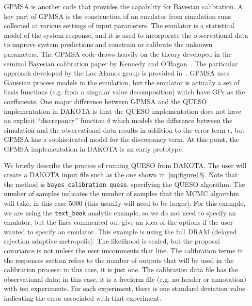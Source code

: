 GPMSA is another code that provides the capability for Bayesian 
calibration.
A key part of GPMSA is the construction of an emulator from simulation runs 
collected at various settings of input parameters.  The emulator is a 
statistical model of the system response, and it is used to incorporate 
the observational data to improve system predictions and constrain or 
calibrate the unknown parameters. The GPMSA code draws heavily 
on the theory developed in the seminal Bayesian calibration paper 
by Kennedy and O'Hagan~\cite{Kenn01}. The particular approach developed 
by the Los Alamos group is provided in~\cite{Hig08}. GPMSA uses 
Gaussian process models in the emulation, but the emulator is 
actually a set of basis functions (e.g. from a singular value 
decomposition) which have GPs as the coefficients.  One major 
difference between GPMSA and the QUESO implementation in DAKOTA 
is that the QUESO implementation does not have an explicit 
``discrepancy'' function $\delta$ which models the difference between 
the simulation and the observational data results in addition 
to the error term $\epsilon$, but GPMSA has a sophisticated 
model for the discrepancy term. 
At this point, the GPMSA implementation in DAKOTA is an early 
prototype. 
 

We briefly describe the process of running QUESO from DAKOTA.
The user will create a DAKOTA input file such as the one shown 
in~\ref{uq:figure18}.  
Note that the method is \texttt{bayes\_calibration queso}, 
specifying the QUESO algorithm. The number of 
samples indicates the number of samples that the MCMC algorithm 
will take, in this case 5000 (this usually will need to be larger). 
For this example, we are using the \texttt{text\_book} analytic 
example, so we do not need to specify an emulator, but the lines 
commented out give an idea of the options if the user wanted to 
specify an emulator.  This example is using the full DRAM (delayed
rejection adaptive metropolis).  The likelihood is scaled, but the 
proposal covariance is not unless the user uncomments that line.  
The calibration terms in the responses section refers to the 
number of outputs that will be used in the calibration process:  
in this case, it is just one.  The calibration data file 
has the observational data:  in this case, it is a freeform file 
(e.g. no header or annotation) with ten experiments.  For each 
experiment, there is one standard deviation value indicating the 
error associated with that experiment. 

